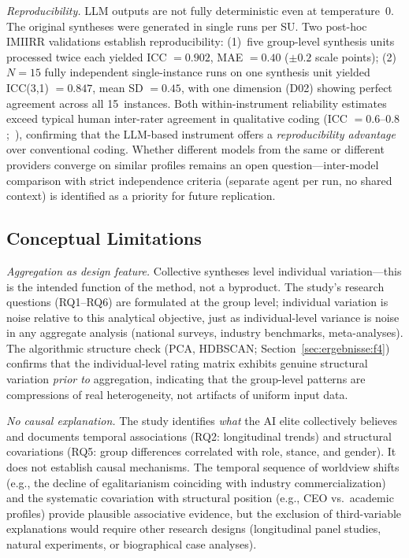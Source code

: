 \documentclass[12pt,a4paper]{article}
\begin{document}
\emph{Reproducibility.} LLM outputs are not fully deterministic even at temperature~0. The original syntheses were generated in single runs per SU. Two post-hoc IMIIRR validations establish reproducibility: (1)~five group-level synthesis units processed twice each yielded ICC $= 0.902$, MAE $= 0.40$ ($\pm 0.2$ scale points); (2)~$N = 15$ fully independent single-instance runs on one synthesis unit yielded ICC(3,1) $= 0.847$, mean SD $= 0.45$, with one dimension (D02) showing perfect agreement across all 15~instances. Both within-instrument reliability estimates exceed typical human inter-rater agreement in qualitative coding (ICC $= 0.6$--$0.8$;~\citealt{Hallgren2012}), confirming that the LLM-based instrument offers a \emph{reproducibility advantage} over conventional coding. Whether different models from the same or different providers converge on similar profiles remains an open question---inter-model comparison with strict independence criteria (separate agent per run, no shared context) is identified as a priority for future replication.


\subsection{Conceptual Limitations}

\emph{Aggregation as design feature.} Collective syntheses level individual variation---this is the intended function of the method, not a byproduct. The study's research questions (RQ1--RQ6) are formulated at the group level; individual variation is noise relative to this analytical objective, just as individual-level variance is noise in any aggregate analysis (national surveys, industry benchmarks, meta-analyses). The algorithmic structure check (PCA, HDBSCAN; Section~\ref{sec:ergebnisse:f4}) confirms that the individual-level rating matrix exhibits genuine structural variation \emph{prior to} aggregation, indicating that the group-level patterns are compressions of real heterogeneity, not artifacts of uniform input data.

\emph{No causal explanation.} The study identifies \emph{what} the AI elite collectively believes and documents temporal associations (RQ2: longitudinal trends) and structural covariations (RQ5: group differences correlated with role, stance, and gender). It does not establish causal mechanisms. The temporal sequence of worldview shifts (e.g., the decline of egalitarianism coinciding with industry commercialization) and the systematic covariation with structural position (e.g., CEO vs.\ academic profiles) provide plausible associative evidence, but the exclusion of third-variable explanations would require other research designs (longitudinal panel studies, natural experiments, or biographical case analyses).
\end{document}
